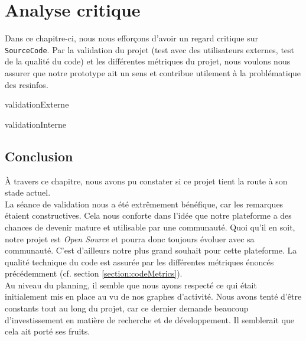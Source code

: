 \chapter{Analyse critique}
\label{section:validation}

Dans ce chapitre-ci, nous nous efforçons d'avoir un regard critique sur \texttt{SourceCode}. Par la validation du projet (test avec des utilisateurs externes, test de la qualité du code) et les différentes métriques du projet, nous voulons nous assurer que notre prototype ait un sens et contribue utilement à la problématique des \glspl{resinfo}.

{validationExterne}

{validationInterne}

\section{Conclusion}

À travers ce chapitre, nous avons pu constater si ce projet tient la route à son stade actuel.\\

La séance de validation nous a été extrêmement bénéfique, car les remarques étaient constructives. 
Cela nous conforte dans l'idée que notre plateforme a des chances de devenir mature et utilisable par une communauté. 
Quoi qu'il en soit, notre projet est \textit{Open Source} et pourra donc toujours évoluer avec sa communauté. 
C'est d'ailleurs notre plus grand souhait pour cette plateforme.
La qualité technique du code est assurée par les différentes métriques énoncés précédemment (cf. section \ref{section:codeMetrics}).\\

Au niveau du planning, il semble que nous ayons respecté ce qui était initialement mis en place au vu de nos graphes d'activité. 
Nous avons tenté d'être constants tout au long du projet, car ce dernier demande beaucoup d'investissement en matière de recherche et de développement. 
Il semblerait que cela ait porté ses fruits.